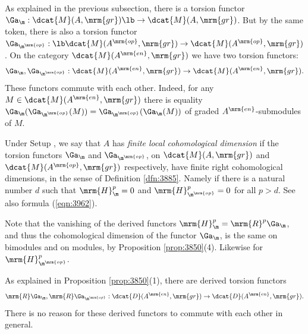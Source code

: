 As explained in the previous subsection, there is a torsion functor 
$\Ga_{\m} : \dcat{M}(A, \mrm{gr}) \lb \to \dcat{M}(A, \mrm{gr})$.
But by the same token, there is also a torsion functor 
$\Ga_{\m^{\mrm{op}}} : \lb \dcat{M}(A^{\mrm{op}}, \mrm{gr}) \to 
\dcat{M}(A^{\mrm{op}}, \mrm{gr})$.
On the category $\dcat{M}(A^{\mrm{en}}, \mrm{gr})$ we have two 
torsion functors:
\[ \Ga_{\m}, \Ga_{\m^{\mrm{op}}} : \dcat{M}(A^{\mrm{en}}, \mrm{gr}) \to 
\dcat{M}(A^{\mrm{en}}, \mrm{gr}) . \]
These functors commute with each other. Indeed, for any 
$M \in \dcat{M}(A^{\mrm{en}}, \mrm{gr})$ there is equality 
$\Ga_{\m}(\Ga_{\m^{\mrm{op}}}(M)) = \Ga_{\m^{\mrm{op}}}(\Ga_{\m}(M))$
of graded $A^{\mrm{en}}$-submodules of $M$. 

\begin{dfn} \label{dfn:3766} 
Under Setup \tup{\ref{setup:3855}}, we say that $A$ has 
{\em finite local cohomological dimension}%
if the torsion functors $\Ga_{\m}$ and $\Ga_{\m^{\mrm{op}}}$,
on $\dcat{M}(A, \mrm{gr})$ and 
$\dcat{M}(A^{\mrm{op}}, \mrm{gr})$ respectively, have finite right 
cohomological dimensions, 
in the sense of Definition \ref{dfn:3885}. Namely if there is a natural number 
$d$ such that $\mrm{H}^p_{\m} = 0$ and $\mrm{H}^p_{\m^{\mrm{op}}} = 0$ 
for all $p > d$. See also formula (\ref{eqn:3962}). 
\end{dfn}

Note that the vanishing of the derived functors  
$\mrm{H}^p_{\m} = \mrm{R}^p \Ga_{\m}$, and thus the cohomological dimension of 
the functor $\Ga_{\m}$, is the same on bimodules and on modules, by Proposition 
\ref{prop:3850}(4). Likewise for $\mrm{H}^p_{\m^{\mrm{op}}}$.

As explained in Proposition \ref{prop:3850}(1), there are derived torsion 
functors 
\begin{equation} \label{eqn:3817}
\mrm{R} \Ga_{\m}, \mrm{R} \Ga_{\m^{\mrm{op}}} : 
\dcat{D}(A^{\mrm{en}}, \mrm{gr}) \to \dcat{D}(A^{\mrm{en}}, \mrm{gr}) .
\end{equation}
There is no reason for these derived functors to commute with each other in 
general. 

